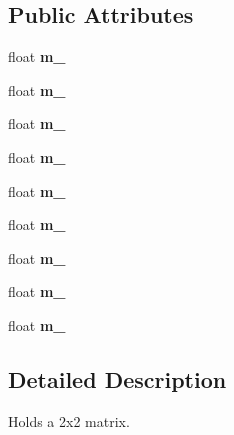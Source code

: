 \subsection*{Public Attributes}
\begin{DoxyCompactItemize}
\item 
\mbox{\label{class_flounder_1_1_matrix3_a35a8dca96ecf492f4debf1d12b184b4d}} 
float {\bfseries m\+\_}
\item 
\mbox{\label{class_flounder_1_1_matrix3_a5cbf46b6d472514a9eb12e22843dfab2}} 
float {\bfseries m\+\_}
\item 
\mbox{\label{class_flounder_1_1_matrix3_aee08b28b689c020bf5e3ba7ab5cb5e97}} 
float {\bfseries m\+\_}
\item 
\mbox{\label{class_flounder_1_1_matrix3_ad6262d0f29f24806a5c08da44454ece4}} 
float {\bfseries m\+\_}
\item 
\mbox{\label{class_flounder_1_1_matrix3_ad0ce5051391080185e98b71ef06bfe01}} 
float {\bfseries m\+\_}
\item 
\mbox{\label{class_flounder_1_1_matrix3_af457dfb4024ad8c612f1cd8d2143d009}} 
float {\bfseries m\+\_}
\item 
\mbox{\label{class_flounder_1_1_matrix3_ac6132de02f3331092f3800685c48b7fa}} 
float {\bfseries m\+\_}
\item 
\mbox{\label{class_flounder_1_1_matrix3_a855d2e1328ab4cf632d0b666ef039669}} 
float {\bfseries m\+\_}
\item 
\mbox{\label{class_flounder_1_1_matrix3_a3f2865133cabfd59d5a1a7e6653d34e5}} 
float {\bfseries m\+\_}
\end{DoxyCompactItemize}


\subsection{Detailed Description}
Holds a 2x2 matrix. 



